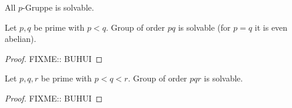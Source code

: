 \begin{theorem}
    All \(p\)-Gruppe is solvable.
\end{theorem}

\begin{theorem}
    Let \(p,q\) be prime with \(p<q\). Group of order \(pq\) is solvable (for \(p = q\) it is even abelian).
\end{theorem}

\begin{proof}
    FIXME:: BUHUI
\end{proof}

\begin{theorem}
    Let \(p,q,r\) be prime with \(p<q<r\). Group of order \(pqr\) is solvable.
\end{theorem}

\begin{proof}
    FIXME:: BUHUI
\end{proof}
